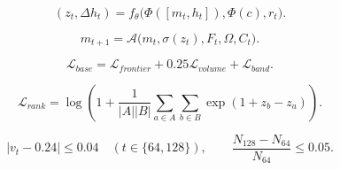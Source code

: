 \[
(z_t,\Delta h_t)=f_\theta\bigl(\Phi([m_t,h_t]),\Phi(c),r_t\bigr).
\]

\[
m_{t+1}=\mathcal{A}\bigl(m_t,\sigma(z_t),F_t,\Omega,C_t\bigr).
\]

\[
\mathcal{L}_{base}=\mathcal{L}_{frontier}+0.25\mathcal{L}_{volume}+\mathcal{L}_{band}.
\]

\[
\mathcal{L}_{rank}=\log\left(1+\frac{1}{|A||B|}\sum_{a\in A}\sum_{b\in B}\exp(1+z_b-z_a)\right).
\]

\[
\left|v_t-0.24\right|\leq0.04\quad(t\in\{64,128\}),\qquad\frac{N_{128}-N_{64}}{N_{64}}\leq0.05.
\]